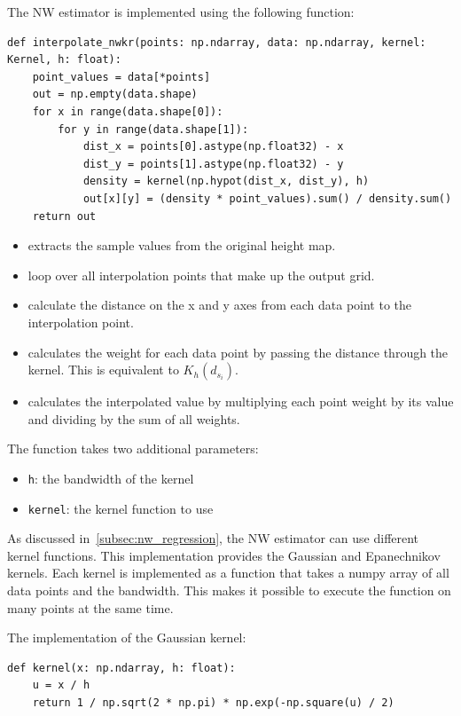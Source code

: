 \begin{minipage}{\textwidth}
The NW estimator is implemented using the following function:
\begin{lstlisting}[language={[AS]Python},caption=Interpolation with the NW estimator]
def interpolate_nwkr(points: np.ndarray, data: np.ndarray, kernel: Kernel, h: float):
    point_values = data[*points]
    out = np.empty(data.shape)
    for x in range(data.shape[0]):
        for y in range(data.shape[1]):
            dist_x = points[0].astype(np.float32) - x
            dist_y = points[1].astype(np.float32) - y
            density = kernel(np.hypot(dist_x, dist_y), h)
            out[x][y] = (density * point_values).sum() / density.sum()
    return out
\end{lstlisting}
\end{minipage}
\begin{itemize}
    \item {} extracts the sample values from the original height map.
    \item {} loop over all interpolation points that make up the output grid.
    \item {} calculate the distance on the x and y axes from each data point to the interpolation point.
    \item {} calculates the weight for each data point by passing the distance through the kernel. This is equivalent to $K_h\left(d_{s_i}\right)$.
    \item {} calculates the interpolated value by multiplying each point weight by its value and dividing by the sum of all weights.
\end{itemize}

The function takes two additional parameters:
\begin{itemize}
    \item \verb|h|: the bandwidth of the kernel
    \item \verb|kernel|: the kernel function to use
\end{itemize}

As discussed in\ \autoref{subsec:nw_regression}, the NW estimator can use different kernel functions. This implementation provides the Gaussian and Epanechnikov kernels. Each kernel is implemented as a function that takes a numpy array of all data points and the bandwidth. This makes it possible to execute the function on many points at the same time.

\begin{minipage}{\textwidth}
The implementation of the Gaussian kernel:
\begin{lstlisting}[language={[AS]Python},caption=The Gaussian kernel]
def kernel(x: np.ndarray, h: float):
    u = x / h
    return 1 / np.sqrt(2 * np.pi) * np.exp(-np.square(u) / 2)
\end{lstlisting}
\end{minipage}

